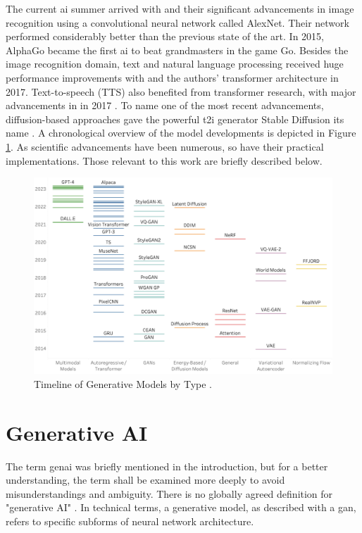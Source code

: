 \documentclass[
  a4paper,  %
  twoside,  %
  bibliography=totoc,
  headsepline,
  cleardoublepage=empty,
  parskip=half,
  draft=false
]{scrbook}
\begin{document}
The current \gls{ai} summer arrived with \citet{krizhevskyImageNetClassificationDeep2012} and their significant advancements in image recognition using a convolutional neural network called AlexNet. Their network performed considerably better than the previous state of the art. In 2015, AlphaGo became the first \gls{ai} to beat grandmasters in the game Go. Besides the image recognition domain, text and natural language processing received huge performance improvements with  and the authors' transformer architecture in 2017. Text-to-speech (TTS) also benefited from transformer research, with major advancements in  in 2017 \cite{wangTacotronEndtoEndSpeech2017}. To name one of the most recent advancements, diffusion-based approaches gave the powerful \gls{t2i} generator Stable Diffusion its name \cite{rombachHighResolutionImageSynthesis2022}. A chronological overview of the model developments is depicted in Figure \ref{fig:timeline-models}. As scientific advancements have been numerous, so have their practical implementations. Those relevant to this work are briefly described below.

\begin{figure}[h]
  \centering
  \includegraphics[width=1\textwidth]{./graphics/Timeline_of_generative_models_by_type.png}
  \caption{Timeline of Generative Models by Type \citet{garcia-penalvoWhatWeMean2023}.}
  \label{fig:timeline-models}
\end{figure}

\section{Generative AI}
\label{sec:genai}
The term \gls{genai} was briefly mentioned in the introduction, but for a better understanding, the term shall be examined more deeply to avoid misunderstandings and ambiguity. There is no globally agreed definition for "generative AI" \cite{garcia-penalvoWhatWeMean2023}. In technical terms, a generative model, as described with a \gls{gan}, refers to specific subforms of neural network architecture.
\end{document}
